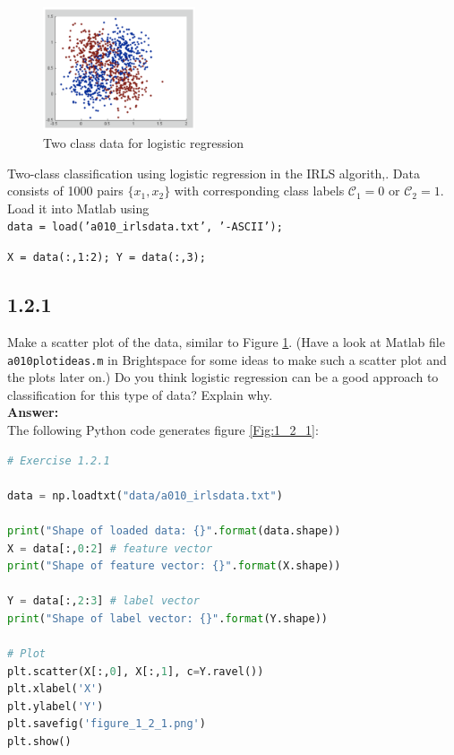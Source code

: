 \documentclass[a4paper]{article}
\begin{document}
\begin{figure}[H]
\center
\includegraphics[width=0.4\textwidth]{Images/two-class-dataset.png}
\caption{Two class data for logistic regression}
\label{Fig:two-class-dataset}
\end{figure}

Two-class classification using logistic regression in the IRLS algorith,. Data consists of 1000 pairs $\{ x_1, x_2 \}$ with corresponding class labels $\mathcal{C}_1 = 0$ or $\mathcal{C}_2 = 1$. Load it into Matlab using\\

\hspace{1cm} \texttt{data = load('a010\_irlsdata.txt', '-ASCII');}

\hspace{1cm} \texttt{X = data(:,1:2); Y = data(:,3);}\\

\subsection*{1.2.1}

Make a scatter plot of the data, similar to Figure \ref{Fig:two-class-dataset}. (Have a look at Matlab file \texttt{a010plotideas.m} in Brightspace for some ideas to make such a scatter plot and the plots later on.) Do you think logistic regression can be a good approach to classification for this type of data? Explain why.\\

\textbf{Answer:}\\

The following Python code generates figure \ref{Fig:1_2_1}:

\begin{lstlisting}[language=Python]
# Exercise 1.2.1

data = np.loadtxt("data/a010_irlsdata.txt")

print("Shape of loaded data: {}".format(data.shape))
X = data[:,0:2] # feature vector
print("Shape of feature vector: {}".format(X.shape))

Y = data[:,2:3] # label vector
print("Shape of label vector: {}".format(Y.shape))

# Plot
plt.scatter(X[:,0], X[:,1], c=Y.ravel())
plt.xlabel('X')
plt.ylabel('Y')
plt.savefig('figure_1_2_1.png')
plt.show()
\end{lstlisting}
\end{document}
